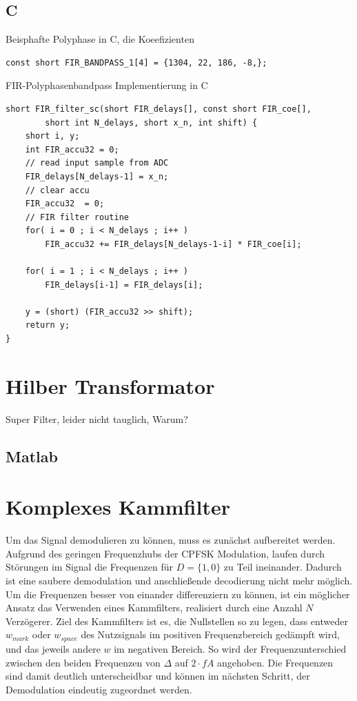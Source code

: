 \documentclass{article}
\begin{document}
\subsection{C}

\begin{listing}\label{codeC:dezimation}
    \caption{Beisphafte Polyphase in C, die Koeefizienten}
    \begin{verbatim}
const short FIR_BANDPASS_1[4] = {1304, 22, 186, -8,};
    \end{verbatim}
\end{listing}


\begin{listing}\label{codeC:FIR}
    \caption{FIR-Polyphasenbandpass Implementierung in C}
    \begin{verbatim}
short FIR_filter_sc(short FIR_delays[], const short FIR_coe[], 
        short int N_delays, short x_n, int shift) {
    short i, y;
    int FIR_accu32 = 0;
    // read input sample from ADC
    FIR_delays[N_delays-1] = x_n;	 
    // clear accu
    FIR_accu32	= 0;
    // FIR filter routine				
    for( i = 0 ; i < N_delays ; i++ )		
        FIR_accu32 += FIR_delays[N_delays-1-i] * FIR_coe[i];
    
    for( i = 1 ; i < N_delays ; i++ )				
        FIR_delays[i-1] = FIR_delays[i];

    y = (short) (FIR_accu32 >> shift);
    return y;
}
    \end{verbatim}
\end{listing}

\section{Hilber Transformator}\label{sec:hilbert}
Super Filter, leider nicht tauglich, Warum?

\subsection{Matlab}

\section{Komplexes Kammfilter}\label{sec:comb}
Um das Signal demodulieren zu können, muss es zunächst aufbereitet werden. 
Aufgrund des geringen Frequenzhubs der CPFSK Modulation, laufen durch Störungen im Signal die Frequenzen 
für $D = \{1, 0\}$ zu Teil ineinander. Dadurch ist eine saubere demodulation und anschließende decodierung
nicht mehr möglich. Um die Frequenzen besser von einander differenziern zu können, ist ein möglicher Ansatz 
das Verwenden eines Kammfilters, realisiert durch eine Anzahl $N$ Verzögerer.
Ziel des Kammfilters ist es, die Nullstellen so zu legen, dass entweder $w_{mark}$ oder $w_{space}$ des Nutzsignals im positiven Frequenzbereich
gedämpft wird, und das jeweils andere $w$ im negativen Bereich. So wird der Frequenzunterschied zwischen den beiden Frequenzen von $\varDelta$ auf $2\cdot fA$ angehoben.
Die Frequenzen sind damit deutlich unterscheidbar und können im nächsten Schritt, der Demodulation eindeutig zugeordnet werden.
\end{document}
